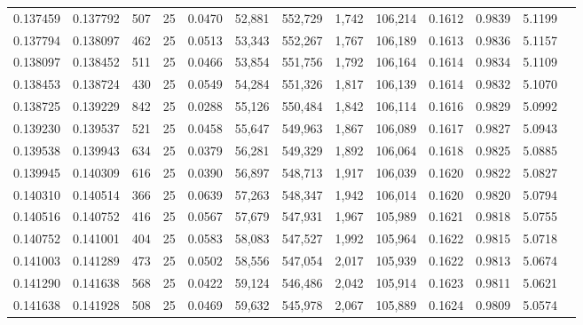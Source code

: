 \begin{tabular}{rrrrrrrrrrrrr}
0.137459 & 0.137792 &   507 &  25 &                                     0.0470 &  52,881 & 552,729 &   1,742 & 106,214 & 0.1612 & 0.9839 & 5.1199 \\
0.137794 & 0.138097 &   462 &  25 &                                     0.0513 &  53,343 & 552,267 &   1,767 & 106,189 & 0.1613 & 0.9836 & 5.1157 \\
0.138097 & 0.138452 &   511 &  25 &                                     0.0466 &  53,854 & 551,756 &   1,792 & 106,164 & 0.1614 & 0.9834 & 5.1109 \\
0.138453 & 0.138724 &   430 &  25 &                                     0.0549 &  54,284 & 551,326 &   1,817 & 106,139 & 0.1614 & 0.9832 & 5.1070 \\
0.138725 & 0.139229 &   842 &  25 &                                     0.0288 &  55,126 & 550,484 &   1,842 & 106,114 & 0.1616 & 0.9829 & 5.0992 \\
0.139230 & 0.139537 &   521 &  25 &                                     0.0458 &  55,647 & 549,963 &   1,867 & 106,089 & 0.1617 & 0.9827 & 5.0943 \\
0.139538 & 0.139943 &   634 &  25 &                                     0.0379 &  56,281 & 549,329 &   1,892 & 106,064 & 0.1618 & 0.9825 & 5.0885 \\
0.139945 & 0.140309 &   616 &  25 &                                     0.0390 &  56,897 & 548,713 &   1,917 & 106,039 & 0.1620 & 0.9822 & 5.0827 \\
0.140310 & 0.140514 &   366 &  25 &                                     0.0639 &  57,263 & 548,347 &   1,942 & 106,014 & 0.1620 & 0.9820 & 5.0794 \\
0.140516 & 0.140752 &   416 &  25 &                                     0.0567 &  57,679 & 547,931 &   1,967 & 105,989 & 0.1621 & 0.9818 & 5.0755 \\
0.140752 & 0.141001 &   404 &  25 &                                     0.0583 &  58,083 & 547,527 &   1,992 & 105,964 & 0.1622 & 0.9815 & 5.0718 \\
0.141003 & 0.141289 &   473 &  25 &                                     0.0502 &  58,556 & 547,054 &   2,017 & 105,939 & 0.1622 & 0.9813 & 5.0674 \\
0.141290 & 0.141638 &   568 &  25 &                                     0.0422 &  59,124 & 546,486 &   2,042 & 105,914 & 0.1623 & 0.9811 & 5.0621 \\
0.141638 & 0.141928 &   508 &  25 &                                     0.0469 &  59,632 & 545,978 &   2,067 & 105,889 & 0.1624 & 0.9809 & 5.0574 \\

\end{tabular}
